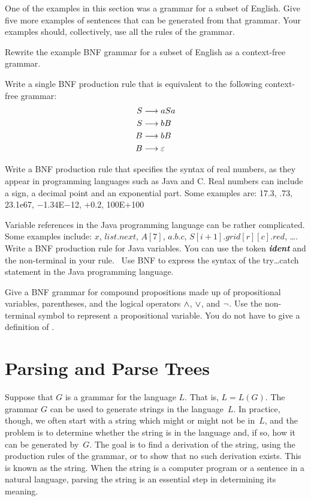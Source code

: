 \begin{exercises}

\problem One of the examples in this section was a grammar for
a subset of English.  Give five more examples of sentences that
can be generated from that grammar.  Your examples should, collectively,
use all the rules of the grammar.

\problem Rewrite the example BNF grammar for a subset of English as
a context-free grammar.

\problem Write a single BNF production rule that is equivalent to
the following context-free grammar:
\begin{align*}
    S &\longrightarrow aSa\\
    S &\longrightarrow bB\\
    B &\longrightarrow bB\\
    B &\longrightarrow \varepsilon
\end{align*}

\problem Write a BNF production rule that specifies the syntax of
real numbers, as they appear in programming languages such as Java and C.  
Real numbers can include a sign, a decimal point and an exponential part.
Some examples are:  17.3, .73, 23.1e67, $-$1.34E$-$12, +0.2, 100E+100

\problem Variable references in the Java programming language can be 
rather complicated.  Some examples include:
$x$, $list.next$, $A[7]$, $a.b.c$, $S[i+1].grid[r][c].red$, \dots.
Write a BNF production rule for Java variables.
You can use the token \textbf{\textsl{ident}} and the non-terminal
 in your rule.
\
\problem Use BNF to express the syntax of the try\dots catch statement in the
Java programming language.

\problem Give a BNF grammar for compound propositions made up
of propositional variables, parentheses, and the logical operators
$\wedge$, $\vee$, and $\lnot$.  Use the non-terminal symbol  to represent
a propositional variable.  You do not have to give a definition of
\NT{pv}.

\end{exercises}


\section{Parsing and Parse Trees}\label{S-grammars-3}

Suppose that $G$ is a grammar for the language $L$.  That is, 
$L=L(G)$.  The grammar $G$ can be used to generate strings in
the language~$L$.  In practice, though, we often start with a string
which might or might not be in~$L$, and the problem is
to determine whether the string is in the language and, if so,
how it can be generated by~$G$.  The goal is to find a derivation
of the string, using the production rules of the grammar, or to
show that no such derivation exists.  This is known as 
the string.  When the string is a computer program or a sentence
in a natural language, parsing the string is an essential step
in determining its meaning.

